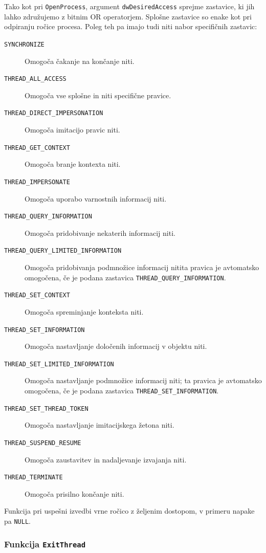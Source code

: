 \documentclass[a4paper,12pt,openright]{book}
\begin{document}
Tako kot pri \texttt{OpenProcess}, argument \texttt{dwDesiredAccess} sprejme zastavice, ki jih lahko združujemo z bitnim OR operatorjem.
Splošne zastavice so enake kot pri odpiranju ročice procesa.
Poleg teh pa imajo tudi niti nabor specifičnih zastavic:
\begin{description}
	\item[\texttt{SYNCHRONIZE}] Omogoča čakanje na končanje niti.
	\item[\texttt{THREAD\_ALL\_ACCESS}] Omogoča vse splošne in niti specifične pravice.
	\item[\texttt{THREAD\_DIRECT\_IMPERSONATION}] Omogoča imitacijo pravic niti.
	\item[\texttt{THREAD\_GET\_CONTEXT}] Omogoča branje kontexta niti.
	\item[\texttt{THREAD\_IMPERSONATE}] Omogoča uporabo varnostnih informacij niti.
	\item[\texttt{THREAD\_QUERY\_INFORMATION}] Omogoča pridobivanje nekaterih informacij niti.
	\item[\texttt{THREAD\_QUERY\_LIMITED\_INFORMATION}] Omogoča pridobivanja podmnožice informacij nitita pravica je avtomatsko omogočena, če je podana zastavica \texttt{THREAD\_QUERY\_INFORMATION}.
	\item[\texttt{THREAD\_SET\_CONTEXT}] Omogoča spreminjanje konteksta niti.
	\item[\texttt{THREAD\_SET\_INFORMATION}] Omogoča nastavljanje določenih informacij v objektu niti.
	\item[\texttt{THREAD\_SET\_LIMITED\_INFORMATION}] Omogoča nastavljanje podmnožice informacij niti; ta pravica je avtomatsko omogočena, če je podana zastavica \texttt{THREAD\_SET\_INFORMATION}.
	\item[\texttt{THREAD\_SET\_THREAD\_TOKEN}] Omogoča nastavljanje imitacijskega žetona niti.
	\item[\texttt{THREAD\_SUSPEND\_RESUME}] Omogoča zaustavitev in nadaljevanje izvajanja niti.
	\item[\texttt{THREAD\_TERMINATE}] Omogoča prisilno končanje niti.
\end{description}

Funkcija pri uspešni izvedbi vrne ročico z željenim dostopom, v primeru napake pa \texttt{NULL}.

\subsubsection{Funkcija \texttt{ExitThread}}
\end{document}
